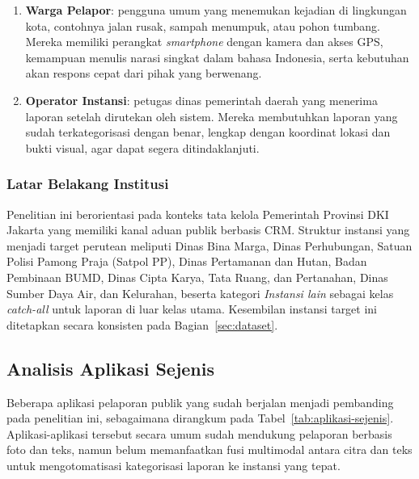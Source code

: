 \begin{enumerate}
    \item \textbf{Warga Pelapor}: pengguna umum yang menemukan kejadian di lingkungan kota, contohnya jalan rusak, sampah menumpuk, atau pohon tumbang. Mereka memiliki perangkat \textit{smartphone} dengan kamera dan akses GPS, kemampuan menulis narasi singkat dalam bahasa Indonesia, serta kebutuhan akan respons cepat dari pihak yang berwenang.
    \item \textbf{Operator Instansi}: petugas dinas pemerintah daerah yang menerima laporan setelah dirutekan oleh sistem. Mereka membutuhkan laporan yang sudah terkategorisasi dengan benar, lengkap dengan koordinat lokasi dan bukti visual, agar dapat segera ditindaklanjuti.
\end{enumerate}

\subsubsection{Latar Belakang Institusi}

Penelitian ini berorientasi pada konteks tata kelola Pemerintah Provinsi DKI Jakarta yang memiliki kanal aduan publik berbasis CRM. Struktur instansi yang menjadi target perutean meliputi Dinas Bina Marga, Dinas Perhubungan, Satuan Polisi Pamong Praja (Satpol PP), Dinas Pertamanan dan Hutan, Badan Pembinaan BUMD, Dinas Cipta Karya, Tata Ruang, dan Pertanahan, Dinas Sumber Daya Air, dan Kelurahan, beserta kategori \textit{Instansi lain} sebagai kelas \textit{catch-all} untuk laporan di luar kelas utama. Kesembilan instansi target ini ditetapkan secara konsisten pada Bagian~\ref{sec:dataset}.

\subsection{Analisis Aplikasi Sejenis}

Beberapa aplikasi pelaporan publik yang sudah berjalan menjadi pembanding pada penelitian ini, sebagaimana dirangkum pada Tabel~\ref{tab:aplikasi-sejenis}. Aplikasi-aplikasi tersebut secara umum sudah mendukung pelaporan berbasis foto dan teks, namun belum memanfaatkan fusi multimodal antara citra dan teks untuk mengotomatisasi kategorisasi laporan ke instansi yang tepat.

